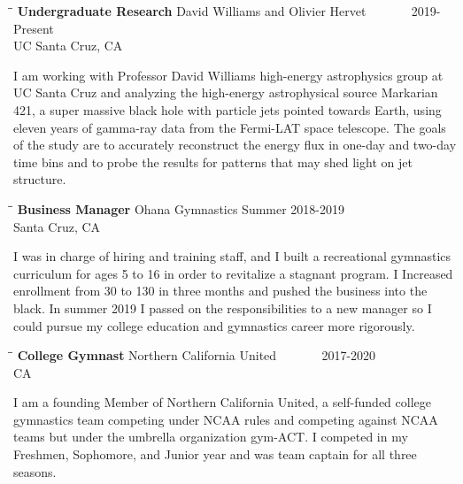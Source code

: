 \documentclass{res}
\begin{document}
\begin{resume}
\begin{tabbing}%
   \hspace{2.3in}\= \hspace{2.6in}\= \kill %
   {\bf Undergraduate Research}  \>David Williams and Olivier Hervet \> ~~~~~~ 2019-Present\\
                          \>UC Santa Cruz, CA
   \end{tabbing}\vspace{-20pt}
   I am working with Professor David Williams high-energy astrophysics group at UC Santa Cruz and analyzing the high-energy astrophysical source Markarian 421, a super massive black hole with particle jets pointed towards Earth, using eleven years of gamma-ray data from the Fermi-LAT space telescope. The goals of the study are to accurately reconstruct the energy flux in one-day and two-day time bins and to probe the results for patterns that may shed light on jet structure.

   
   \begin{tabbing}
   \hspace{2.3in}\= \hspace{2.6in}\= \kill %
    {\bf Business Manager} \>Ohana Gymnastics     \>Summer 2018-2019\\
                             \>Santa Cruz, CA
   \end{tabbing}\vspace{-20pt}      %
    I was in charge of hiring and training staff, and I built a recreational gymnastics curriculum for ages 5 to 16 in order to revitalize a stagnant program. I Increased enrollment from 30 to 130 in three months and pushed the business into the black. In summer 2019 I passed on the responsibilities to a new manager so I could pursue my college education and gymnastics career more rigorously. 
    
   \begin{tabbing}
   \hspace{2.3in}\= \hspace{2.6in}\= \kill %
    {\bf College Gymnast} \>Northern California United \> ~~~~~~ 2017-2020\\
                          \>CA
   \end{tabbing}\vspace{-20pt}
    I am a founding Member of Northern California United, a self-funded college gymnastics team competing under NCAA rules and competing against NCAA teams but under the umbrella organization gym-ACT. I competed in my Freshmen, Sophomore, and  Junior year and was team captain for all three seasons.
    

\end{resume}
\end{document}
